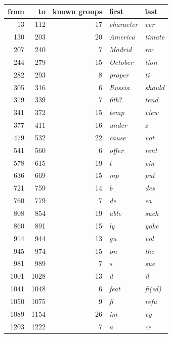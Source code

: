 \documentclass[]{interact}
\begin{document}
\begin{table}
{\begin{tabular}{@{}rrrll@{}}
\toprule
from & to & known groups & first & last \\
\midrule
13 & 112 & 17 & \emph{character} & \emph{ver} \\
130 & 203 & 20 & \emph{America} & \emph{timate} \\
207 & 240 & 7 & \emph{Madrid} & \emph{roc} \\
244 & 279 & 15 & \emph{October} & \emph{tion} \\
282 & 293 & 8 & \emph{proper} & \emph{ti} \\
305 & 316 & 6 & \emph{Russia} & \emph{should} \\
319 & 339 & 7 & \emph{6th}? & \emph{tend} \\
341 & 372 & 15 & \emph{temp} & \emph{view} \\
377 & 411 & 16 & \emph{under} & \emph{z} \\
479 & 532 & 22 & \emph{cause} & \emph{vot} \\
541 & 560 & 6 & \emph{offer} & \emph{rent} \\
578 & 615 & 19 & \emph{t} & \emph{vin} \\
636 & 669 & 15 & \emph{mp} & \emph{put} \\
721 & 759 & 14 & \emph{b} & \emph{des} \\
760 & 779 & 7 & \emph{de} & \emph{ea} \\
808 & 854 & 19 & \emph{able} & \emph{such} \\
860 & 891 & 15 & \emph{ly} & \emph{yoke} \\
914 & 944 & 13 & \emph{gu} & \emph{vol} \\
945 & 974 & 15 & \emph{on} & \emph{tho} \\
981 & 989 & 7 & \emph{s} & \emph{sue} \\
1001 & 1028 & 13 & \emph{d} & \emph{il} \\
1041 & 1048 & 6 & \emph{feat} & \emph{fi(ed)} \\
1050 & 1075 & 9 & \emph{fi} & \emph{refu} \\
1089 & 1154 & 26 & \emph{im} & \emph{vy} \\
1203 & 1222 & 7 & \emph{a} & \emph{ce} \\

\end{tabular}}
\end{table}
\end{document}
